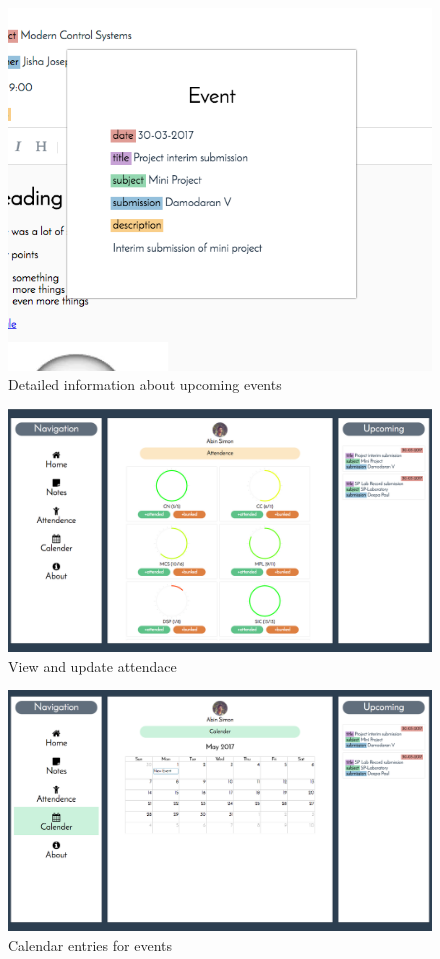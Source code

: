 \documentclass{article}
\begin{document}
\begin{figure}
  \includegraphics[width=\linewidth]{eventinfo.png}
  \caption{Detailed information about upcoming events}
\end{figure}

\begin{figure}
  \includegraphics[width=\linewidth]{attendance.png}
  \caption{View and update attendace}
\end{figure}

\begin{figure}
  \includegraphics[width=\linewidth]{calendar.png}
  \caption{Calendar entries for events}
\end{figure}
\end{document}
